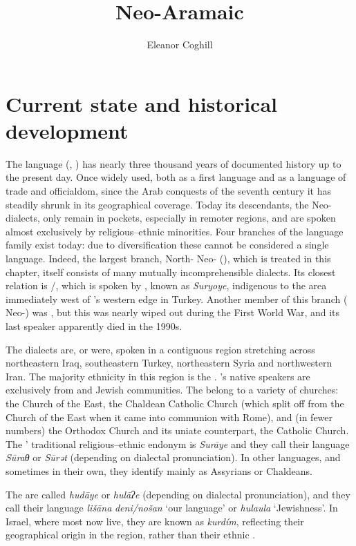 \documentclass[output=paper]{langsci/langscibook}
\author{Eleanor Coghill\affiliation{Uppsala University}}
\title{Neo-Aramaic}
\begin{document}
\section{Current state and historical development}

The  language (, ) has nearly three thousand years of documented history up to the present day. Once widely used, both as a first language and as a language of trade and officialdom, since the Arab conquests of the seventh century it has steadily shrunk in its geographical coverage. Today its descendants, the Neo- dialects, only remain in pockets, especially in remoter regions, and are spoken almost exclusively by religious–ethnic minorities. Four branches of the language family exist today: due to diversification these cannot be considered a single language. Indeed, the largest branch, North- Neo- (), which is treated in this chapter, itself consists of many mutually incomprehensible dialects. Its closest relation is /, which is spoken by , known as \textit{Suryoye}, indigenous to the area immediately west of ’s western edge in Turkey. Another member of this branch ( Neo-) was , but this was nearly wiped out during the First World War, and its last speaker apparently died in the 1990s. 

The  dialects are, or were, spoken in a contiguous region stretching across northeastern Iraq, southeastern Turkey, northeastern Syria and northwestern Iran. The majority ethnicity in this region is the . ’s native speakers are exclusively from  and Jewish communities. The  belong to a variety of churches: the Church of the East, the Chaldean Catholic Church (which split off from the Church of the East when it came into communion with Rome), and (in fewer numbers) the  Orthodox Church and its uniate counterpart, the  Catholic Church. The ’ traditional religious–ethnic endonym is \textit{Surāye} and they call their language \textit{Sūraθ} or \textit{Sūrət} (depending on dialectal pronunciation). In other languages, and sometimes in their own, they identify mainly as Assyrians or Chaldeans.

The  are called \textit{hudāye} or \textit{hulāʔe} (depending on dialectal pronunciation), and they call their language \textit{lišāna} \textit{deni/nošan} ‘our language’ or \textit{hulaula} ‘Jewishness’. In Israel, where most now live, they are known as \textit{kurdím}, reflecting their geographical origin in the  region, rather than their ethnic .
\end{document}
